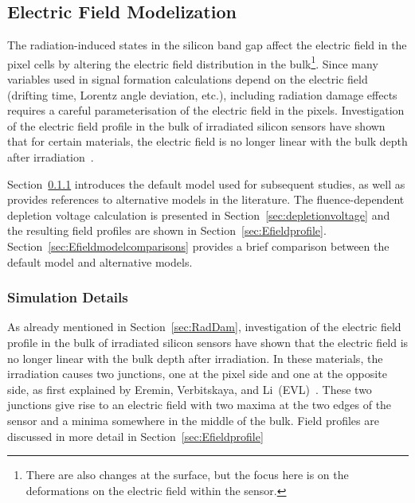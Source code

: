 
\subsection{Electric Field Modelization}
\label{sec:ElecFieldMod}
The radiation-induced states in the silicon band gap affect the electric field in the pixel cells by altering 
the electric field distribution in the bulk\footnote{There are also changes at the surface, but the focus 
here is on the deformations on the electric field within the sensor.}. Since many variables used in signal 
formation calculations depend on the electric field (drifting time, Lorentz angle deviation, etc.), including 
radiation damage effects requires a careful parameterisation of the electric field in the pixels. 
Investigation of the electric field profile in the bulk of irradiated silicon sensors have shown that for 
certain materials, the electric field is no longer linear with the bulk depth after irradiation~\cite{bib:DP}.  

Section~\ref{sec:ElectricField:SimulationDetails} introduces the default model used for subsequent studies, as well as provides references to alternative models in the literature.   The fluence-dependent depletion voltage calculation is presented in Section~\ref{sec:depletionvoltage} and the resulting field profiles are shown in Section~\ref{sec:Efieldprofile}.  Section~\ref{sec:Efieldmodelcomparisons} provides a brief comparison between the default model and alternative models.

\subsubsection{Simulation Details}
\label{sec:ElectricField:SimulationDetails}



As already mentioned in Section~\ref{sec:RadDam}, investigation of the electric field profile in the bulk of irradiated silicon sensors have shown that the electric field is no longer linear with the bulk depth after irradiation. In these materials, the irradiation causes two junctions, one at the pixel side and one at the opposite side, as first explained by Eremin, Verbitskaya, and Li~(EVL)~\cite{bib:DP}. These two junctions give rise to an electric field with two maxima at the two edges of the sensor and a minima somewhere in the middle of the bulk.  Field profiles are discussed in more detail in Section~\ref{sec:Efieldprofile}

